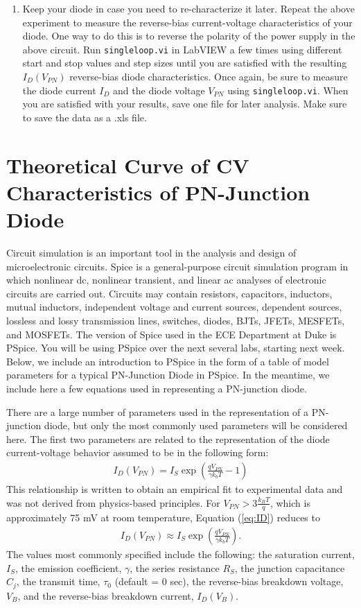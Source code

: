 \documentclass[12pt]{../manual}
\begin{document}
\begin{enumerate}
\item Keep your diode in case you need to re-characterize it later. Repeat the above
experiment to measure the reverse-bias current-voltage characteristics of your
diode. One way to do this is to reverse the polarity of the power supply in the
above circuit. Run {\tt singleloop.vi} in LabVIEW a few times using different start
and stop values and step sizes until you are satisfied with the resulting $I_D(V_{PN})$
reverse-bias diode characteristics. Once again, be sure to measure the diode
current $I_D$ and the diode voltage $V_{PN}$ using {\tt singleloop.vi}. When you are
satisfied with your results, save one file for later analysis. Make sure to save the
data as a .xls file.
\end{enumerate}

\section{Theoretical Curve of CV Characteristics of PN-Junction Diode}
Circuit simulation is an important tool in the analysis and design of microelectronic circuits. Spice is a general-purpose circuit simulation program in which nonlinear dc, nonlinear transient, and linear ac analyses of electronic circuits are carried out. Circuits may contain resistors, capacitors, inductors, mutual inductors, independent voltage and current sources, dependent sources, lossless and lossy transmission lines, switches, diodes, BJTs, JFETs, MESFETs, and MOSFETs. The version of Spice used in the ECE Department at Duke is PSpice. You will be using PSpice over the next several labs, starting next week. Below, we include an introduction to PSpice in the form of a table of model parameters for a typical PN-Junction Diode in PSpice. In the meantime, we include here a few equations used in representing a PN-junction diode.

There are a large number of parameters used in the representation of a PN-junction
diode, but only the most commonly used parameters will be considered here. The first
two parameters are related to the representation of the diode current-voltage behavior
assumed to be in the following form:
\begin{align}
I_D(V_{PN}) = I_S \exp\left(\frac{q V_{PN}}{\gamma k_b T} - 1\right) \label{eq:ID}
\end{align}
This relationship is written to obtain an empirical fit to experimental data and was not derived from physics-based principles. For $V_{PN} > 3\frac{k_BT}{q}$, which is
approximately 75 mV at room temperature, Equation (\ref{eq:ID}) reduces to
\begin{align}
I_D(V_{PN}) \approx I_S \exp\left(\frac{q V_{PN}}{\gamma k_b T}\right). \label{eq:redID}
\end{align}
The values most commonly specified include the following: the saturation current, $I_S$, the emission coefficient, $\gamma$, the series resistance $R_S$, the junction capacitance $C_j$, the transmit time, $\tau_0$ (default = 0 sec), the reverse-bias breakdown voltage, $V_B$, and the reverse-bias breakdown current, $I_D(V_B)$.
\end{document}
